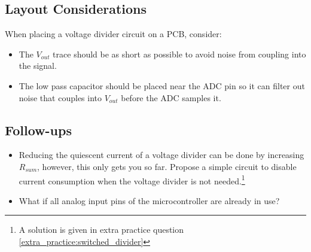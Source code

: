 \documentclass[main.tex]{subfiles}
\begin{document}
\subsection{Layout Considerations}
When placing a voltage divider circuit on a PCB, consider:
\begin{itemize}
    \item The $V_{out}$ trace should be as short as possible to avoid noise from coupling into the signal. 
    \item The low pass capacitor should be placed near the ADC pin so it can filter out noise that couples into $V_{out}$ before the ADC samples it.
\end{itemize}

\subsection{Follow-ups}
\begin{itemize}
    \item Reducing the quiescent current of a voltage divider can be done by increasing $R_{sum}$, however, this only gets you so far. Propose a simple circuit to disable current consumption when the voltage divider is not needed.\footnote{A solution is given in extra practice question \ref{extra_practice:switched_divider}}
    \item What if all analog input pins of the microcontroller are already in use? %
\end{itemize}
\end{document}
